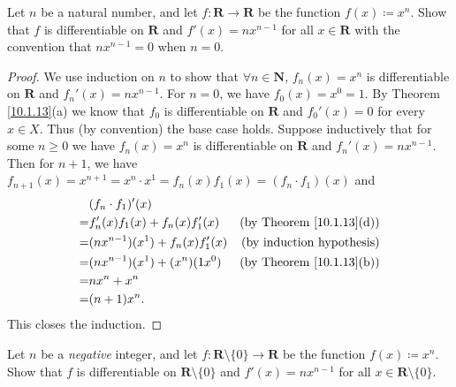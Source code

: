 \begin{exercise}\label{ex 10.1.5}
    Let \(n\) be a natural number, and let \(f : \mathbf{R} \to \mathbf{R}\) be the function \(f(x) \coloneqq x^n\).
    Show that \(f\) is differentiable on \(\mathbf{R}\) and \(f'(x) = n x^{n - 1}\) for all \(x \in \mathbf{R}\) with the convention that \(n x^{n - 1} = 0\) when \(n = 0\).
\end{exercise}

\begin{proof}
    We use induction on \(n\) to show that \(\forall n \in \mathbf{N}\), \(f_n(x) = x^n\) is differentiable on \(\mathbf{R}\) and \(f_n'(x) = n x^{n - 1}\).
    For \(n = 0\), we have \(f_0(x) = x^0 = 1\).
    By Theorem \ref{10.1.13}(a) we know that \(f_0\) is differentiable on \(\mathbf{R}\) and \(f_0'(x) = 0\) for every \(x \in X\).
    Thus (by convention) the base case holds.
    Suppose inductively that for some \(n \geq 0\) we have \(f_n(x) = x^n\) is differentiable on \(\mathbf{R}\) and \(f_n'(x) = n x^{n - 1}\).
    Then for \(n + 1\), we have \(f_{n + 1}(x) = x^{n + 1} = x^n \cdot x^1 = f_n(x) f_1(x) = (f_n \cdot f_1)(x)\) and
    \begin{align*}
          & (f_n \cdot f_1)'(x)                                                        \\
        = & f_n'(x) f_1(x) + f_n(x) f_1'(x)     & \text{(by Theorem \ref{10.1.13}(d))} \\
        = & (n x^{n - 1})(x^1) + f_n(x) f_1'(x) & \text{(by induction hypothesis)}     \\
        = & (n x^{n - 1})(x^1) + (x^n)(1 x^0)   & \text{(by Theorem \ref{10.1.13}(b))} \\
        = & n x^n + x^n                                                                \\
        = & (n + 1) x^n.
    \end{align*}
    This closes the induction.
\end{proof}

\begin{exercise}\label{ex 10.1.6}
    Let \(n\) be a \emph{negative} integer, and let \(f : \mathbf{R} \setminus \{0\} \to \mathbf{R}\) be the function \(f(x) \coloneqq x^n\).
    Show that \(f\) is differentiable on \(\mathbf{R} \setminus \{0\}\) and \(f'(x) = n x^{n - 1}\) for all \(x \in \mathbf{R} \setminus \{0\}\).
\end{exercise}

